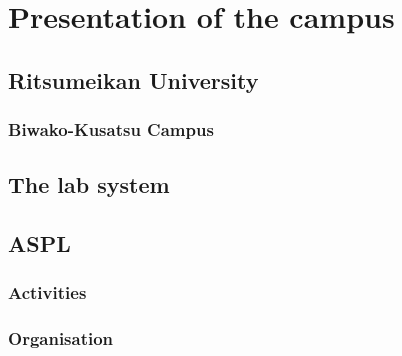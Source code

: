 \section{Presentation of the campus}
\subsection{Ritsumeikan University}
\subsubsection{Biwako-Kusatsu Campus}
\subsection{The lab system}
\subsection{\ac{ASPL}}
\subsubsection{Activities}
\subsubsection{Organisation}
